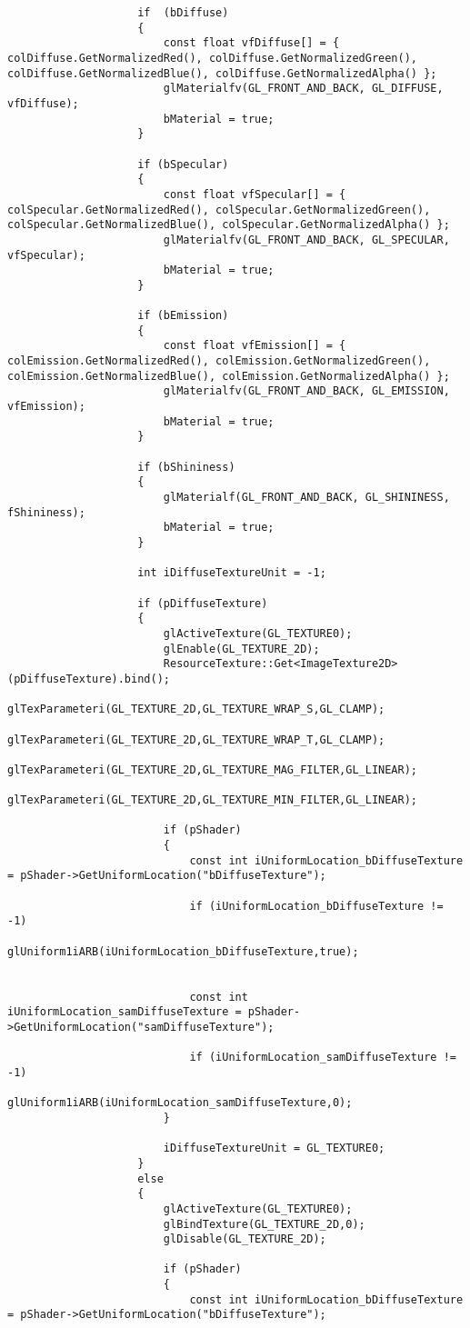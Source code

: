 \begin{verbatim}
					if  (bDiffuse)
					{
						const float vfDiffuse[] = { colDiffuse.GetNormalizedRed(), colDiffuse.GetNormalizedGreen(), colDiffuse.GetNormalizedBlue(), colDiffuse.GetNormalizedAlpha() };
						glMaterialfv(GL_FRONT_AND_BACK, GL_DIFFUSE, vfDiffuse);
						bMaterial = true;
					}

					if (bSpecular)
					{
						const float vfSpecular[] = { colSpecular.GetNormalizedRed(), colSpecular.GetNormalizedGreen(), colSpecular.GetNormalizedBlue(), colSpecular.GetNormalizedAlpha() };
						glMaterialfv(GL_FRONT_AND_BACK, GL_SPECULAR, vfSpecular);
						bMaterial = true;
					}

					if (bEmission)
					{
						const float vfEmission[] = { colEmission.GetNormalizedRed(), colEmission.GetNormalizedGreen(), colEmission.GetNormalizedBlue(), colEmission.GetNormalizedAlpha() };
						glMaterialfv(GL_FRONT_AND_BACK, GL_EMISSION, vfEmission);
						bMaterial = true;
					}

					if (bShininess)
					{
						glMaterialf(GL_FRONT_AND_BACK, GL_SHININESS, fShininess);
						bMaterial = true;
					}

					int iDiffuseTextureUnit = -1;

					if (pDiffuseTexture)
					{
						glActiveTexture(GL_TEXTURE0);
						glEnable(GL_TEXTURE_2D);
						ResourceTexture::Get<ImageTexture2D>(pDiffuseTexture).bind();
						glTexParameteri(GL_TEXTURE_2D,GL_TEXTURE_WRAP_S,GL_CLAMP);
						glTexParameteri(GL_TEXTURE_2D,GL_TEXTURE_WRAP_T,GL_CLAMP);
						glTexParameteri(GL_TEXTURE_2D,GL_TEXTURE_MAG_FILTER,GL_LINEAR);
						glTexParameteri(GL_TEXTURE_2D,GL_TEXTURE_MIN_FILTER,GL_LINEAR);

						if (pShader)
						{
							const int iUniformLocation_bDiffuseTexture = pShader->GetUniformLocation("bDiffuseTexture");

							if (iUniformLocation_bDiffuseTexture != -1)
								glUniform1iARB(iUniformLocation_bDiffuseTexture,true);


							const int iUniformLocation_samDiffuseTexture = pShader->GetUniformLocation("samDiffuseTexture");

							if (iUniformLocation_samDiffuseTexture != -1)
								glUniform1iARB(iUniformLocation_samDiffuseTexture,0);
						}

						iDiffuseTextureUnit = GL_TEXTURE0;
					}
					else
					{
						glActiveTexture(GL_TEXTURE0);
						glBindTexture(GL_TEXTURE_2D,0);
						glDisable(GL_TEXTURE_2D);

						if (pShader)
						{
							const int iUniformLocation_bDiffuseTexture = pShader->GetUniformLocation("bDiffuseTexture");


\end{verbatim}
